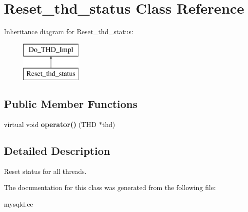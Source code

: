 \hypertarget{classReset__thd__status}{}\section{Reset\+\_\+thd\+\_\+status Class Reference}
\label{classReset__thd__status}
Inheritance diagram for Reset\+\_\+thd\+\_\+status\+:\begin{figure}[H]
\begin{center}
\leavevmode
\includegraphics[height=2.000000cm]{classReset__thd__status}
\end{center}
\end{figure}
\subsection*{Public Member Functions}
\begin{DoxyCompactItemize}
\item 
\mbox{\label{classReset__thd__status_af2990642fcc3badfc451c3cbe0eea78b}} 
virtual void {\bfseries operator()} (T\+HD $\ast$thd)
\end{DoxyCompactItemize}


\subsection{Detailed Description}
Reset status for all threads. 

The documentation for this class was generated from the following file\+:\begin{DoxyCompactItemize}
\item 
mysqld.\+cc\end{DoxyCompactItemize}
